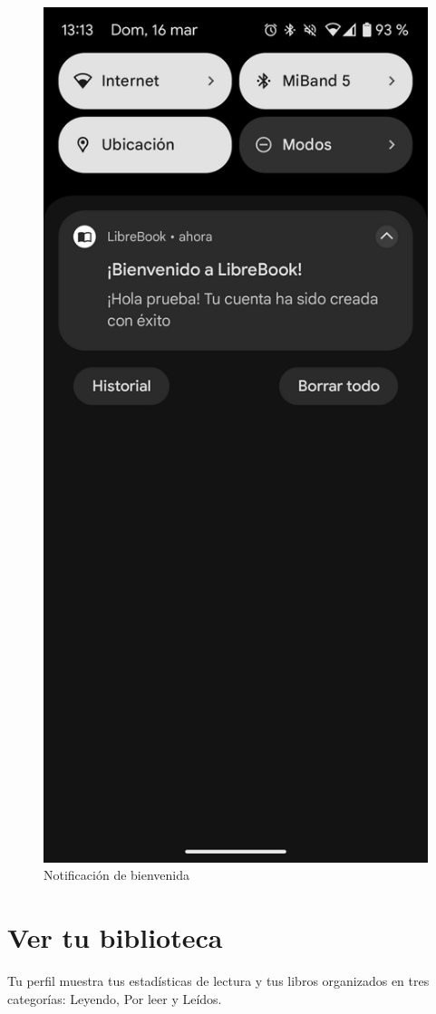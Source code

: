 \documentclass[a4paper,12pt]{report}
\begin{document}
\begin{multicols}{2}
        \begin{figure}[H]
          \centering
          \includegraphics[width=0.65\linewidth]{.img/registro-noti.png}
          \caption{Notificación de bienvenida}
        \end{figure}
        \vspace{-0.8em}  %
        
        \section{Ver tu biblioteca}
        \vspace{-0.8em}  %
        Tu perfil muestra tus estadísticas de lectura y tus libros organizados en tres categorías: Leyendo, Por leer y Leídos.
        

\end{multicols}
\end{document}
